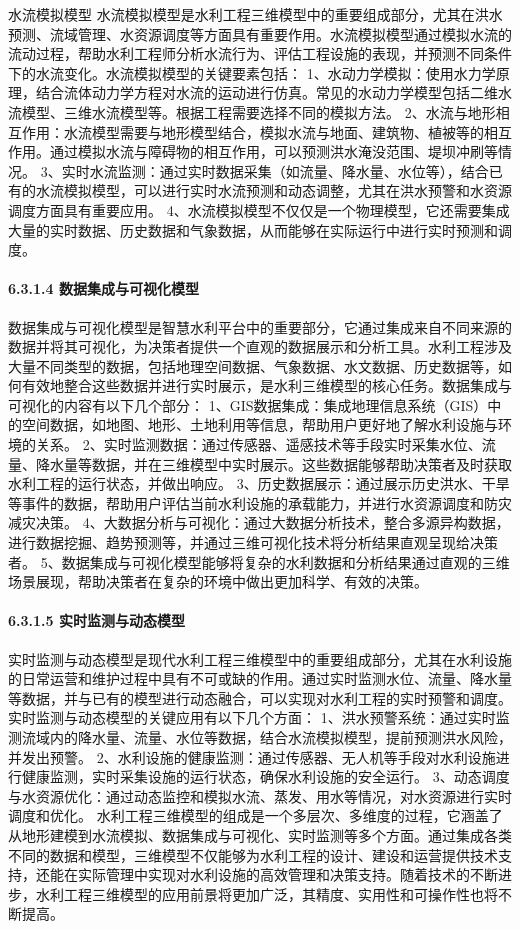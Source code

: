 {{水流模拟模型}\label{ux6c34ux6d41ux6a21ux62dfux6a21ux578b}
水流模拟模型是水利工程三维模型中的重要组成部分，尤其在洪水预测、流域管理、水资源调度等方面具有重要作用。水流模拟模型通过模拟水流的流动过程，帮助水利工程师分析水流行为、评估工程设施的表现，并预测不同条件下的水流变化。水流模拟模型的关键要素包括：
1、水动力学模拟：使用水力学原理，结合流体动力学方程对水流的运动进行仿真。常见的水动力学模型包括二维水流模型、三维水流模型等。根据工程需要选择不同的模拟方法。
2、水流与地形相互作用：水流模型需要与地形模型结合，模拟水流与地面、建筑物、植被等的相互作用。通过模拟水流与障碍物的相互作用，可以预测洪水淹没范围、堤坝冲刷等情况。
3、实时水流监测：通过实时数据采集（如流量、降水量、水位等），结合已有的水流模拟模型，可以进行实时水流预测和动态调整，尤其在洪水预警和水资源调度方面具有重要应用。
4、水流模拟模型不仅仅是一个物理模型，它还需要集成大量的实时数据、历史数据和气象数据，从而能够在实际运行中进行实时预测和调度。 \paragraph{6.3.1.4
数据集成与可视化模型}\label{ux6570ux636eux96c6ux6210ux4e0eux53efux89c6ux5316ux6a21ux578b}
数据集成与可视化模型是智慧水利平台中的重要部分，它通过集成来自不同来源的数据并将其可视化，为决策者提供一个直观的数据展示和分析工具。水利工程涉及大量不同类型的数据，包括地理空间数据、气象数据、水文数据、历史数据等，如何有效地整合这些数据并进行实时展示，是水利三维模型的核心任务。数据集成与可视化的内容有以下几个部分：
1、GIS数据集成：集成地理信息系统（GIS）中的空间数据，如地图、地形、土地利用等信息，帮助用户更好地了解水利设施与环境的关系。
2、实时监测数据：通过传感器、遥感技术等手段实时采集水位、流量、降水量等数据，并在三维模型中实时展示。这些数据能够帮助决策者及时获取水利工程的运行状态，并做出响应。
3、历史数据展示：通过展示历史洪水、干旱等事件的数据，帮助用户评估当前水利设施的承载能力，并进行水资源调度和防灾减灾决策。
4、大数据分析与可视化：通过大数据分析技术，整合多源异构数据，进行数据挖掘、趋势预测等，并通过三维可视化技术将分析结果直观呈现给决策者。
5、数据集成与可视化模型能够将复杂的水利数据和分析结果通过直观的三维场景展现，帮助决策者在复杂的环境中做出更加科学、有效的决策。 \paragraph{6.3.1.5
实时监测与动态模型}\label{ux5b9eux65f6ux76d1ux6d4bux4e0eux52a8ux6001ux6a21ux578b}
实时监测与动态模型是现代水利工程三维模型中的重要组成部分，尤其在水利设施的日常运营和维护过程中具有不可或缺的作用。通过实时监测水位、流量、降水量等数据，并与已有的模型进行动态融合，可以实现对水利工程的实时预警和调度。实时监测与动态模型的关键应用有以下几个方面：
1、洪水预警系统：通过实时监测流域内的降水量、流量、水位等数据，结合水流模拟模型，提前预测洪水风险，并发出预警。 2、水利设施的健康监测：通过传感器、无人机等手段对水利设施进行健康监测，实时采集设施的运行状态，确保水利设施的安全运行。
3、动态调度与水资源优化：通过动态监控和模拟水流、蒸发、用水等情况，对水资源进行实时调度和优化。
水利工程三维模型的组成是一个多层次、多维度的过程，它涵盖了从地形建模到水流模拟、数据集成与可视化、实时监测等多个方面。通过集成各类不同的数据和模型，三维模型不仅能够为水利工程的设计、建设和运营提供技术支持，还能在实际管理中实现对水利设施的高效管理和决策支持。随着技术的不断进步，水利工程三维模型的应用前景将更加广泛，其精度、实用性和可操作性也将不断提高。
}
